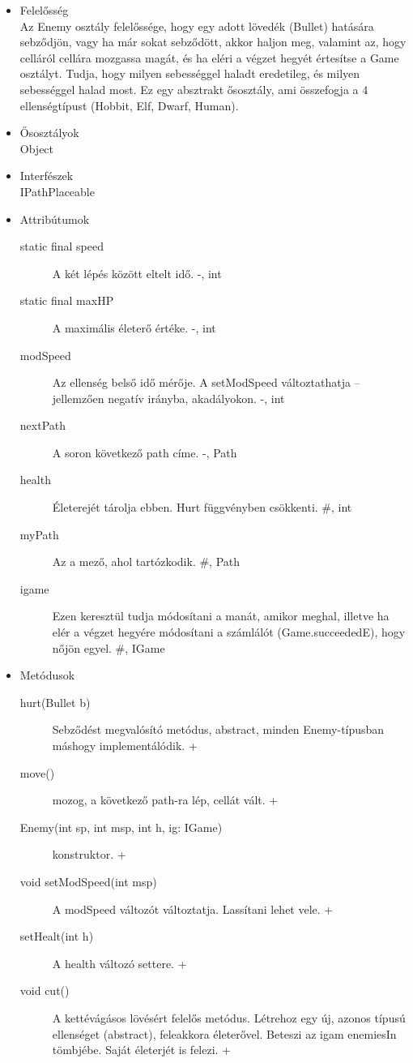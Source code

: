 \begin{itemize}
\item Felelősség\\
Az Enemy osztály felelőssége, hogy egy adott lövedék (Bullet) hatására sebződjön, vagy ha már sokat sebződött, akkor haljon meg, valamint az, hogy celláról cellára mozgassa magát, és ha eléri a végzet hegyét értesítse a Game osztályt. Tudja, hogy milyen sebességgel haladt eredetileg, és milyen sebességgel halad most. Ez egy absztrakt ősosztály, ami összefogja a 4 ellenségtípust (Hobbit, Elf, Dwarf, Human).
\item Ősosztályok\\
Object
\item Interfészek\\
IPathPlaceable
\item Attribútumok\\
	\begin{description}
		\item[static final speed] A két lépés között eltelt idő. -, int
		\item[static final maxHP] A maximális életerő értéke. -, int
\item[modSpeed] Az ellenség belső idő mérője. A setModSpeed változtathatja – jellemzően negatív irányba, akadályokon. -, int
\item[nextPath] A soron következő path címe. -, Path
\item[health] Életerejét tárolja ebben. Hurt függvényben csökkenti. \#, int
\item[myPath] Az a mező, ahol tartózkodik. \#, Path
\item[igame] Ezen keresztül tudja módosítani a manát, amikor meghal, illetve ha elér a végzet hegyére módosítani a számlálót (Game.succeededE), hogy nőjön egyel. \#, IGame

	\end{description}
\item Metódusok\\
	\begin{description}
		\item[hurt(Bullet b)] Sebződést megvalósító metódus, abstract, minden Enemy-típusban máshogy implementálódik. +
\item[move()] mozog, a következő path-ra lép, cellát vált. +
\item[Enemy(int sp, int msp, int h, ig: IGame)] konstruktor. +
\item[void setModSpeed(int msp)] A modSpeed változót változtatja. Lassítani lehet vele. +
\item[setHealt(int h)] A health változó settere. +
\item[void cut()] A kettévágásos lövésért felelős metódus. Létrehoz egy új, azonos típusú ellenséget (abstract), feleakkora életerővel. Beteszi az igam enemiesIn tömbjébe. Saját életerjét is felezi. +

	\end{description}
\end{itemize}

